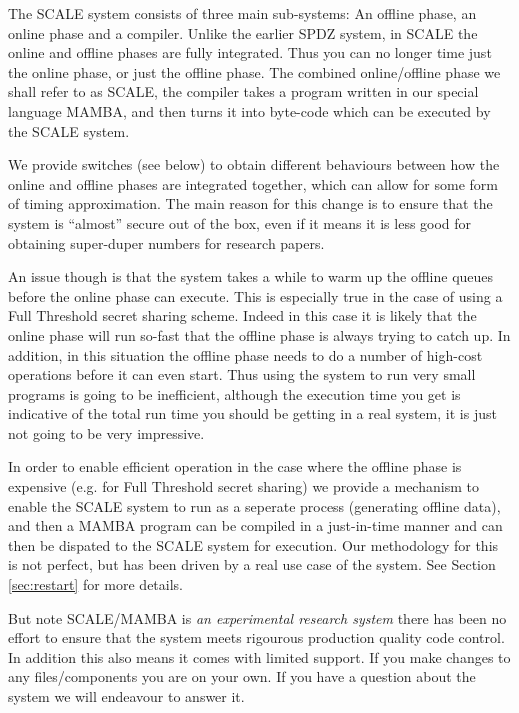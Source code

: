

\label{sec:introduction}
The SCALE system consists of three main sub-systems:
An offline phase, an online phase and a compiler. 
Unlike the earlier SPDZ system, in SCALE the online
and offline phases are fully integrated. Thus you
can no longer time just the online phase, or just
the offline phase.
The combined online/offline phase we shall refer
to as SCALE, the compiler takes a program written
in our special language MAMBA, and then turns it
into byte-code which can be executed by the SCALE
system. 

We provide switches (see below) to obtain 
different behaviours between how the online and offline
phases are integrated together, which can allow for
some form of timing approximation.
The main reason for this change is to ensure that the
system is ``almost'' secure out of the box, even if it
means it is less good for obtaining super-duper numbers
for research papers.

An issue though is that the system takes a while to warm
up the offline queues before the online phase can execute.
This is especially true in the case of using a Full Threshold
secret sharing scheme. Indeed in this case it is likely
that the online phase will run so-fast that the offline
phase is always trying to catch up. In addition, in this
situation the offline phase needs to do a number of
high-cost operations before it can even start. Thus
using the system to run very small programs is going to
be inefficient, although the execution time you get
is indicative of the total run time you should be getting
in a real system, it is just not going to be very
impressive.

In order to enable efficient operation in the case where the
offline phase is expensive (e.g. for Full Threshold secret sharing)
we provide a mechanism to enable the SCALE system to run
as a seperate process (generating offline data), and then
a MAMBA program can be compiled in a just-in-time manner
and can then be dispated to the SCALE system for
execution. Our methodology for this is not perfect, but has
been driven by a real use case of the system.
See Section \ref{sec:restart} for more details.

But note SCALE/MAMBA is {\em an experimental research system} 
there has been no effort to ensure that the system meets rigourous production
quality code control. 
In addition this also means it comes with limited support.
If you make changes to any files/components you are on your
own.
If you have a question about the system we will endeavour to
answer it.

